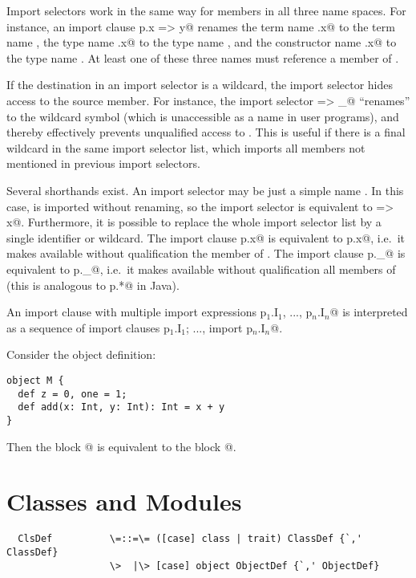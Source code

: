\documentclass[11pt]{report}
\begin{document}
Import selectors work in the same way for members in all three name
spaces.  For instance, an import clause \verb@import p.{x => y}@
renames the term name \verb@p.x@ to the term name \verb@y@, the type
name \verb@p.x@ to the type name \verb@y@, and the constructor name
\verb@p.x@ to the type name \verb@y@. At least one of these three
names must reference a member of \verb@p@.

If the destination in an import selector is a wildcard, the import
selector hides access to the source member. For instance, the import
selector \verb@x => _@ ``renames'' \verb@x@ to the wildcard symbol
(which is unaccessible as a name in user programs), and thereby
effectively prevents unqualified access to \verb@x@. This is useful if
there is a final wildcard in the same import selector list, which
imports all members not mentioned in previous import selectors.

Several shorthands exist. An import selector may be just a simple name
\verb@x@. In this case, \verb@x@ is imported without renaming, so the
import selector is equivalent to \verb@x => x@. Furthermore, it is
possible to replace the whole import selector list by a single
identifier or wildcard. The import clause \verb@import p.x@ is
equivalent to \verb@import p.{x}@, i.e.\ it makes available without
qualification the member \verb@x@ of \verb@p@. The import clause
\verb@import p._@ is equivalent to
\verb@import p.{_}@, 
i.e.\ it makes available without qualification all members of \verb@p@
(this is analogous to \verb@import p.*@ in Java).

An import clause with multiple import expressions
\verb@import p$_1$.I$_1$, ..., p$_n$.I$_n$@ is interpreted as a
sequence of import clauses 
\verb@import p$_1$.I$_1$; ..., import p$_n$.I$_n$@.

\example Consider the object definition:
\begin{verbatim}
object M { 
  def z = 0, one = 1; 
  def add(x: Int, y: Int): Int = x + y 
}
\end{verbatim}
Then the block
@
is equivalent to the block @.

\chapter{Classes and Modules}
\label{sec:globaldefs}

\syntax\begin{verbatim}
  ClsDef          \=::=\= ([case] class | trait) ClassDef {`,' ClassDef}
                  \>  |\> [case] object ObjectDef {`,' ObjectDef}
\end{verbatim}
\end{document}
